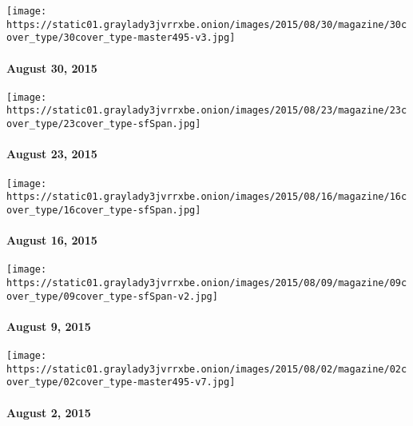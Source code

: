 \href{http://www.nytimes3xbfgragh.onion/indexes/2015/08/30/magazine/index.html}{}

\texttt{[image: https://static01.graylady3jvrrxbe.onion/images/2015/08/30/magazine/30cover\_type/30cover\_type-master495-v3.jpg]}

\hypertarget{august-30-2015}{%
\paragraph{August 30, 2015}\label{august-30-2015}}

\href{http://www.nytimes3xbfgragh.onion/indexes/2015/08/23/magazine/index.html}{}

\texttt{[image: https://static01.graylady3jvrrxbe.onion/images/2015/08/23/magazine/23cover\_type/23cover\_type-sfSpan.jpg]}

\hypertarget{august-23-2015}{%
\paragraph{August 23, 2015}\label{august-23-2015}}

\href{http://www.nytimes3xbfgragh.onion/indexes/2015/08/16/magazine/index.html}{}

\texttt{[image: https://static01.graylady3jvrrxbe.onion/images/2015/08/16/magazine/16cover\_type/16cover\_type-sfSpan.jpg]}

\hypertarget{august-16-2015}{%
\paragraph{August 16, 2015}\label{august-16-2015}}

\href{http://www.nytimes3xbfgragh.onion/indexes/2015/08/09/magazine/index.html}{}

\texttt{[image: https://static01.graylady3jvrrxbe.onion/images/2015/08/09/magazine/09cover\_type/09cover\_type-sfSpan-v2.jpg]}

\hypertarget{august-9-2015}{%
\paragraph{August 9, 2015}\label{august-9-2015}}

\href{http://www.nytimes3xbfgragh.onion/indexes/2015/08/02/magazine/index.html}{}

\texttt{[image: https://static01.graylady3jvrrxbe.onion/images/2015/08/02/magazine/02cover\_type/02cover\_type-master495-v7.jpg]}

\hypertarget{august-2-2015}{%
\paragraph{August 2, 2015}\label{august-2-2015}}

